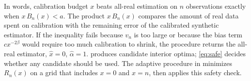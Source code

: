 In words, calibration budget $x$ beats all-real estimation on $n$ observations exactly when $x\,B_n(x)<a$. The product $x\,B_n(x)$ compares the amount of real data spent on calibration with the remaining error of the calibrated synthetic estimator. If the inequality fails because $v_n$ is too large or because the bias term $cx^{-2\beta}$ would require too much calibration to shrink, the procedure returns the all-real estimator, $\hat x=0$, $\hat\alpha=1$.  produces candidate interior optima; \cref{eq:safe} decides whether any candidate should be used. The adaptive procedure in  minimizes $R_n(x)$ on a grid that includes $x=0$ and $x=n$, then applies this safety check.


